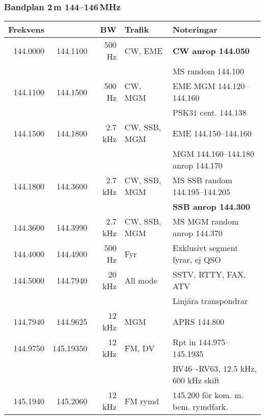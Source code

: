\subsubsection{Bandplan 2\,m 144--146\,MHz}
\begin{tabular}{rrrll}
	
	\textbf{Frekvens} &  & \textbf{BW} & \textbf{Trafik} & \textbf{Noteringar} \\ \hline
	
	144.0000 & 144.1100  & 500 Hz  & CW, EME      & \textbf{CW anrop 144.050}               \\
	&           &         &              & MS random 144.100                       \\ \hline
	144.1100 & 144.1500  & 500 Hz  & CW, MGM      & EME MGM 144.120--144.160                \\
	&           &         &              & PSK31 cent. 144.138                     \\ \hline
	144.1500 & 144.1800  & 2.7 kHz & CW, SSB, MGM & EME 144.150--144.160                    \\
	&           &         &              & MGM 144.160--144.180 anrop 144.170      \\ \hline
	144.1800 & 144.3600  & 2.7 kHz & CW, SSB, MGM & MS SSB random 144.195--144.205          \\
	&           &         &              & \textbf{SSB anrop 144.300}              \\ \hline
	144.3600 & 144.3990  & 2.7 kHz & CW, SSB, MGM & MS MGM random anrop 144.370             \\ \hline
	144.4000 & 144.4900  & 500 Hz  & Fyr          & Exklusivt segment fyrar, ej QSO         \\ \hline
	144.5000 & 144.7940  & 20 kHz  & All mode     & SSTV, RTTY, FAX, ATV                    \\
	&           &         &              & Linjära transpondrar                    \\ \hline
	144.7940 & 144.9625  & 12 kHz  & MGM          & APRS 144.800                            \\ \hline
	144.9750 & 145.19350 & 12 kHz  & FM, DV       & Rpt in 144.975--145.1935                \\
	&           &         &              & RV46–-RV63, 12.5 kHz, 600 kHz skift     \\ \hline
	145.1940 & 145.2060  & 12 kHz  & FM rymd      & 145.200 för kom. m. bem. rymdfark.      \\ \hline

\end{tabular}
